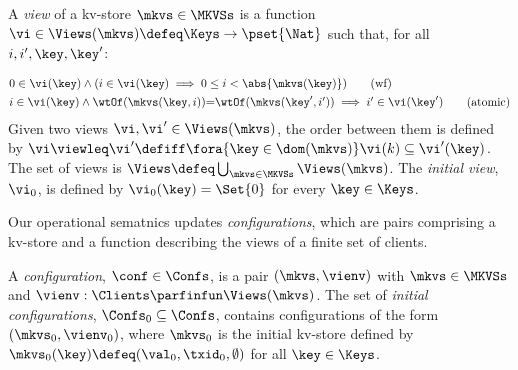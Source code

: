 \begin{definition}[Views]
\label{def:view}
\label{def:cuts}
\label{def:views}
\label{def:configuration}
A \emph{view} of a kv-store $\mkvs \in \MKVSs$ is a function
$\vi \in \Views(\mkvs) \defeq \Keys \to\pset{\Nat}$ such that, for all $i, i', \key, \key'$:
%

\vspace{-5pt}
{%
\displaymathfont
\begin{align*}
    & 
    0 \in \vi(\key) 
    \land (i \in \vi(\key) \implies 0 \leq i < \abs{ \mkvs(\key) }) 
    \tag{wf}
    \label{eq:view.wf}\\
    & 
    \begin{array}{@{}l@{}}
	i \in \vi(\key)  
  	\land \wtOf(\mkvs(\key, i)) {=} \wtOf(\mkvs(\key', i'))  
  	\implies i' \in \vi(\key')
    \end{array}
	\tag{atomic}
	\label{eq:view.atomic}
\end{align*}
}%
Given two views $\vi, \vi' \in \Views(\mkvs)$, 
the order between them is defined by $\vi \viewleq \vi' \defiff \fora{\key \in \dom(\mkvs)} \vi(k) \subseteq \vi'(\key)$.
The set of views is $\Views \defeq \bigcup_{\mkvs \in \MKVSs} \Views(\mkvs)$.
%
\noindent The \emph{initial view}, $\vi_{0}$,  is defined by
$\vi_{0}(\key) = \Set{0}$ for every $\key \in \Keys$. 
\end{definition}

Our operational sematnics updates {\em configurations},  which are pairs
comprising a kv-store and a function describing the
views of a finite set of clients. 

\begin{definition}
A \emph{configuration}, $\conf \in \Confs $,  is a pair $ (\mkvs, \vienv)$
with $\mkvs \in \MKVSs$ and
$\vienv : \Clients \parfinfun \Views(\mkvs)$. 
The set of \emph{initial configurations}, $\Confs_0 \subseteq \Confs$,
contains configurations of the form $ (\mkvs_0, \vienv_0)$, where
$\mkvs_0$ is the { initial kv-store}
defined by
$\mkvs_{0}(\key)\defeq  (\val_0, \txid_0, \emptyset)$ for
all $\key \in \Keys$. 
\end{definition}



